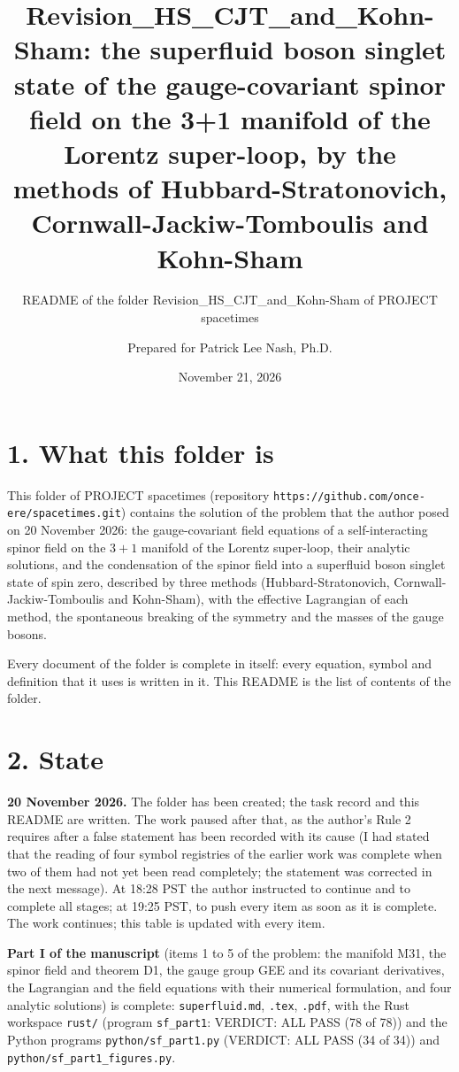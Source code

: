 \documentclass[
  10pt,
]{article}
\title{Revision\_HS\_CJT\_and\_Kohn-Sham: the superfluid boson singlet
state of the gauge-covariant spinor field on the 3+1 manifold of the
Lorentz super-loop, by the methods of Hubbard-Stratonovich,
Cornwall-Jackiw-Tomboulis and Kohn-Sham}
\subtitle{README of the folder Revision\_HS\_CJT\_and\_Kohn-Sham of
PROJECT spacetimes}
\author{Prepared for Patrick Lee Nash, Ph.D.}
\date{November 21, 2026}
\begin{document}
\maketitle

\hypertarget{what-this-folder-is}{%
\section{1. What this folder is}\label{what-this-folder-is}}

This folder of PROJECT spacetimes (repository
\texttt{https://github.com/once-ere/spacetimes.git}) contains the
solution of the problem that the author posed on 20 November 2026: the
gauge-covariant field equations of a self-interacting spinor field on
the \(3+1\) manifold of the Lorentz super-loop, their analytic
solutions, and the condensation of the spinor field into a superfluid
boson singlet state of spin zero, described by three methods
(Hubbard-Stratonovich, Cornwall-Jackiw-Tomboulis and Kohn-Sham), with
the effective Lagrangian of each method, the spontaneous breaking of the
symmetry and the masses of the gauge bosons.

Every document of the folder is complete in itself: every equation,
symbol and definition that it uses is written in it. This README is the
list of contents of the folder.

\hypertarget{state}{%
\section{2. State}\label{state}}

\textbf{20 November 2026.} The folder has been created; the task record
and this README are written. The work paused after that, as the author's
Rule 2 requires after a false statement has been recorded with its cause
(I had stated that the reading of four symbol registries of the earlier
work was complete when two of them had not yet been read completely; the
statement was corrected in the next message). At 18:28 PST the author
instructed to continue and to complete all stages; at 19:25 PST, to push
every item as soon as it is complete. The work continues; this table is
updated with every item.

\textbf{Part I of the manuscript} (items 1 to 5 of the problem: the
manifold M31, the spinor field and theorem D1, the gauge group GEE and
its covariant derivatives, the Lagrangian and the field equations with
their numerical formulation, and four analytic solutions) is complete:
\texttt{superfluid.md}, \texttt{.tex}, \texttt{.pdf}, with the Rust
workspace \texttt{rust/} (program \texttt{sf\_part1}: VERDICT: ALL PASS
(78 of 78)) and the Python programs \texttt{python/sf\_part1.py}
(VERDICT: ALL PASS (34 of 34)) and
\texttt{python/sf\_part1\_figures.py}.
\end{document}
